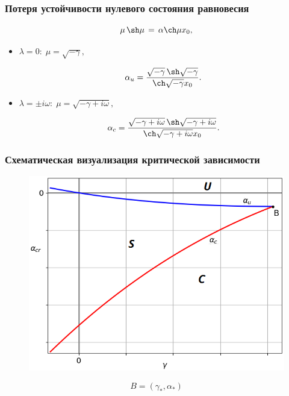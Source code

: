 \documentclass[fullscreen=true, unicode, bookmarks=false]{beamer}
\begin{document}
\begin{frame}
\frametitle{ Потеря устойчивости нулевого состояния равновесия }
 
\begin{equation}
	\mu \, \sh \mu \, = \, \alpha \ch \mu x_0,
\end{equation}

\medskip

\begin{itemize}

\item { $ \lambda = 0: \; \mu = \sqrt{-\gamma}, $ 
}

\begin{equation}
	\alpha_u = \frac{ \sqrt{-\gamma} \, \sh \sqrt{-\gamma} }{ \ch \sqrt{-\gamma} x_0 }.
\end{equation}

\item { $ \lambda = \pm i \omega: \; \mu = \sqrt{-\gamma + i \omega}, $ 
}

\begin{equation}
	\alpha_c = \frac{ \sqrt{-\gamma + i \omega} \, \sh \sqrt{-\gamma + i \omega} }{ \ch \sqrt{-\gamma + i \omega} x_0 }.
\end{equation}

\end{itemize}	

\end{frame}

\begin{frame}
\frametitle{ Схематическая визуализация критической зависимости }

\begin{figure} 
\includegraphics[scale=0.55]{scheme.png}  
\end{figure}

$$ B=(\gamma_*, \alpha_*) $$

\end{frame}
\end{document}

